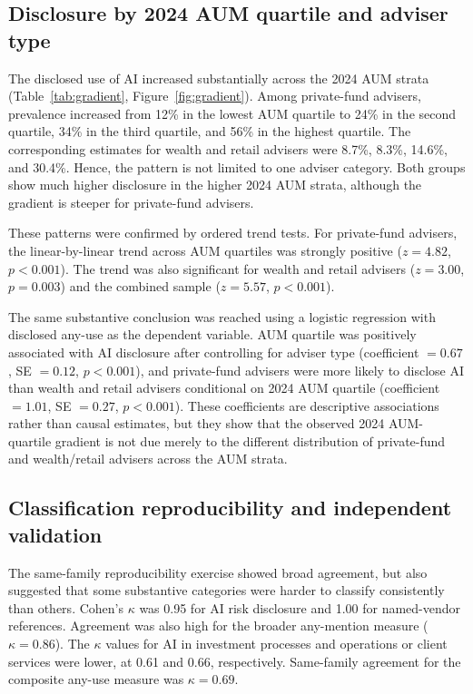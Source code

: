 \documentclass[utf8]{FrontiersinHarvard}
\begin{document}
\subsection{Disclosure by 2024 AUM quartile and adviser type}

The disclosed use of AI increased substantially across the 2024 AUM strata (Table~\ref{tab:gradient}, Figure~\ref{fig:gradient}). Among private-fund advisers, prevalence increased from 12\% in the lowest AUM quartile to 24\% in the second quartile, 34\% in the third quartile, and 56\% in the highest quartile. The corresponding estimates for wealth and retail advisers were 8.7\%, 8.3\%, 14.6\%, and 30.4\%. Hence, the pattern is not limited to one adviser category. Both groups show much higher disclosure in the higher 2024 AUM strata, although the gradient is steeper for private-fund advisers.

These patterns were confirmed by ordered trend tests. For private-fund advisers, the linear-by-linear trend across AUM quartiles was strongly positive ($z = 4.82$, $p < 0.001$). The trend was also significant for wealth and retail advisers ($z = 3.00$, $p = 0.003$) and the combined sample ($z = 5.57$, $p < 0.001$).

The same substantive conclusion was reached using a logistic regression with disclosed any-use as the dependent variable. AUM quartile was positively associated with AI disclosure after controlling for adviser type (coefficient $= 0.67$, SE $= 0.12$, $p < 0.001$), and private-fund advisers were more likely to disclose AI than wealth and retail advisers conditional on 2024 AUM quartile (coefficient $= 1.01$, SE $= 0.27$, $p < 0.001$). These coefficients are descriptive associations rather than causal estimates, but they show that the observed 2024 AUM-quartile gradient is not due merely to the different distribution of private-fund and wealth/retail advisers across the AUM strata.

\subsection{Classification reproducibility and independent validation}

The same-family reproducibility exercise showed broad agreement, but also suggested that some substantive categories were harder to classify consistently than others. Cohen's $\kappa$ was 0.95 for AI risk disclosure and 1.00 for named-vendor references. Agreement was also high for the broader any-mention measure ($\kappa = 0.86$). The $\kappa$ values for AI in investment processes and operations or client services were lower, at 0.61 and 0.66, respectively. Same-family agreement for the composite any-use measure was $\kappa = 0.69$.
\end{document}
